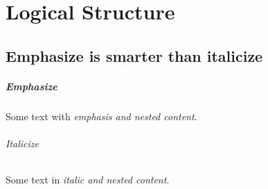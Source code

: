 \documentclass{report}
\begin{document}
\chapter{Logical Structure}
\section{Emphasize is smarter than italicize}
\paragraph{Emphasize} Some text with \emph{emphasis and \emph{nested} content}.

\subparagraph{Italicize} Some text in \textit{italic and \textit{nested} content}.
\end{document}
